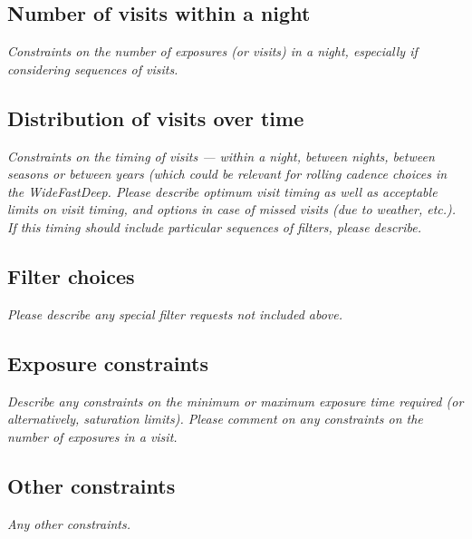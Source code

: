 \documentclass[11pt]{article}
\begin{document}
\subsection{Number of visits within a night}
\begin{footnotesize}{\it Constraints on the number of exposures (or visits) in a night, especially if considering sequences of visits.  }
\end{footnotesize}

\subsection{Distribution of visits over time}
\begin{footnotesize}{\it Constraints on the timing of visits --- within a night, between nights, between seasons or
between years (which could be relevant for rolling cadence choices in the WideFastDeep. 
Please describe optimum visit timing as well as acceptable limits on visit timing, and options in
case of missed visits (due to weather, etc.). If this timing should include particular sequences
of filters, please describe.}
\end{footnotesize}

\subsection{Filter choices}
\begin{footnotesize}
{\it Please describe any special filter requests not included above.}
\end{footnotesize}

\subsection{Exposure constraints}
\begin{footnotesize}
{\it Describe any constraints on the minimum or maximum exposure time required (or alternatively, saturation limits).
Please comment on any constraints on the number of exposures in a visit.}
\end{footnotesize}

\subsection{Other constraints}
\begin{footnotesize}
{\it Any other constraints.}
\end{footnotesize}
\end{document}
